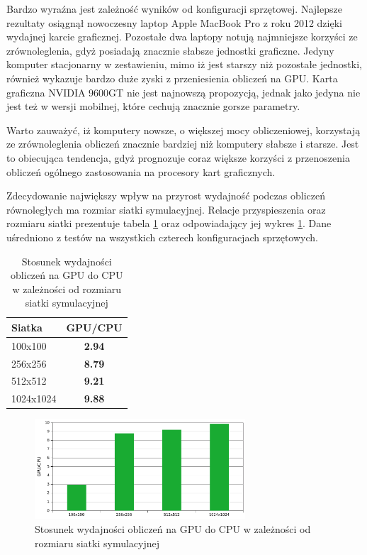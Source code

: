 \clearpage

Bardzo wyraźna jest zależność wyników od konfiguracji sprzętowej. Najlepsze
rezultaty osiągnął nowoczesny laptop Apple MacBook Pro z roku 2012 dzięki
wydajnej karcie graficznej. Pozostałe dwa laptopy notują najmniejsze korzyści ze
zrównoleglenia, gdyż posiadają znacznie słabsze jednostki graficzne. Jedyny
komputer stacjonarny w zestawieniu, mimo iż jest starszy niż pozostałe
jednostki, również wykazuje bardzo duże zyski z przeniesienia obliczeń na GPU.
Karta graficzna NVIDIA 9600GT nie jest najnowszą propozycją, jednak jako jedyna
nie jest też w wersji mobilnej, które cechują znacznie gorsze parametry.

Warto zauważyć, iż komputery nowsze, o większej mocy obliczeniowej, korzystają
ze zrównoleglenia obliczeń znacznie bardziej niż komputery słabsze i starsze.
Jest to obiecująca tendencja, gdyż prognozuje coraz większe korzyści z
przenoszenia obliczeń ogólnego zastosowania na procesory kart graficznych.

Zdecydowanie największy wpływ na przyrost wydajność podczas obliczeń
równoległych ma rozmiar siatki symulacyjnej. Relacje przyspieszenia oraz
rozmiaru siatki prezentuje tabela \ref{tab:gpucpu} oraz odpowiadający jej wykres
\ref{fig:gpucpu}. Dane uśredniono z testów na wszystkich czterech konfiguracjach
sprzętowych.

\begin{table}[!htp]
\caption{Stosunek wydajności obliczeń na GPU do CPU w zależności od rozmiaru
siatki symulacyjnej}
\centering
\begin{tabular}{|l|>{\bfseries}c|}
\hline
\cellcolor{t} Siatka & \cellcolor{gc} GPU/CPU \\ \hline
100x100 & 2.94 \\ \hline
256x256	& 8.79 \\ \hline
512x512	& 9.21 \\ \hline
1024x1024 & 9.88 \\ \hline
\end{tabular}
\label{tab:gpucpu}
\end{table}

\begin{figure}[!h]
\centering
\includegraphics[width=0.7\textwidth]{img/gpucpu}
\caption{Stosunek wydajności obliczeń na GPU do CPU w zależności od rozmiaru
siatki symulacyjnej}
\label{fig:gpucpu}
\end{figure}

